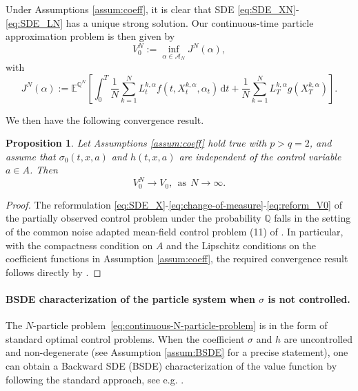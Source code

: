 \documentclass[11pt]{article}
\numberwithin{equation}{section}
\theoremstyle{plain}
\newtheorem{proposition}[theorem]{Proposition}
\theoremstyle{definition}
\theoremstyle{remark}
\newcommand{\dd}{\mathrm{d}}
\begin{document}
	Under Assumptions \ref{assum:coeff}, it is clear that SDE \eqref{eq:SDE_XN}-\eqref{eq:SDE_LN} has a unique strong solution.
	Our continuous-time particle approximation problem is then given by 
	\begin{equation} \label{eq:continuous-N-particle-problem}
		V_0^N :=\inf_{\alpha\in \mathcal{A}_N} J^N(\alpha), 
	\end{equation}
	with
	\begin{equation} \label{eq:defJN}
		J^N(\alpha)
		:=
		\mathbb{E}^{\mathbb{Q}^N}\left[ \int_0^T \frac{1}{N}\sum_{k=1}^N L_t^{k,\alpha} f(t, X_t^{k,\alpha}, \alpha_t)\,\dd t + \frac{1}{N}\sum_{k=1}^N L_T^{k,\alpha} g(X_T^{k,\alpha}) \right].
	\end{equation}
	
	We then have the following convergence result.
	\begin{proposition} \label{prop:CVG_VN}
		Let Assumptions \ref{assum:coeff} hold true with $p > q = 2$, and assume that $\sigma_0(t,x,a)$ and $h(t,x,a)$ are independent of the control variable $a \in A$. 
		Then
		$$
		V_0^N \longrightarrow V_0,
		~~\mbox{as}~~
		N \longrightarrow \infty.
		$$
	\end{proposition}
	\begin{proof}
		The reformulation \eqref{eq:SDE_X}-\eqref{eq:change-of-measure}-\eqref{eq:reform_V0} of the partially observed control problem under the probability $\mathbb{Q}$ falls in the setting of the common noise adapted mean-field control problem (11) of \cite{bouchard2025limit}.
		In particular, with the compactness condition on $A$ and the Lipschitz conditions on the coefficient functions in Assumption \ref{assum:coeff},
		the required convergence result follows directly by \cite[Theorem 3.2]{bouchard2025limit}.
	\end{proof}
	
	
	\paragraph{BSDE characterization of the particle system when $\sigma$ is not controlled.}
	
	The $N$-particle problem~\eqref{eq:continuous-N-particle-problem} is in the form of standard optimal control problems.
	When the coefficient $\sigma$ and $h$ are uncontrolled and non-degenerate (see Assumption \ref{assum:BSDE} for a precise statement), one can obtain a Backward SDE (BSDE) characterization of the value function by following the standard approach, see e.g. \cite[Theorem 4.5.3]{zhang2017backward}.
	
\end{document}
